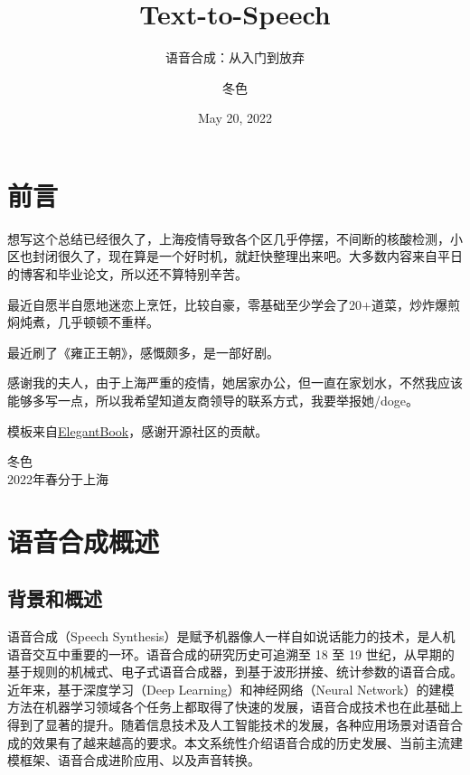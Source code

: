 \documentclass[cn,10pt,math=newtx,citestyle=gb7714-2015,bibstyle=gb7714-2015]{elegantbook}
\title{Text-to-Speech}
\subtitle{语音合成：从入门到放弃}
\author{冬色}
\institute{https://github.com/cnlinxi}
\date{May 20, 2022}
\begin{document}
\maketitle
\frontmatter

\chapter*{前言}


想写这个总结已经很久了，上海疫情导致各个区几乎停摆，不间断的核酸检测，小区也封闭很久了，现在算是一个好时机，就赶快整理出来吧。大多数内容来自平日的博客和毕业论文，所以还不算特别辛苦。

最近自愿半自愿地迷恋上烹饪，比较自豪，零基础至少学会了20+道菜，炒炸爆煎焖炖煮，几乎顿顿不重样。

最近刷了《雍正王朝》，感慨颇多，是一部好剧。

感谢我的夫人，由于上海严重的疫情，她居家办公，但一直在家划水，不然我应该能够多写一点，所以我希望知道友商领导的联系方式，我要举报她/doge。

\vskip 0.5cm

模板来自\href{https://github.com/ElegantLaTeX/ElegantBook}{ElegantBook}，感谢开源社区的贡献。

\vskip 1.5cm

\begin{flushright}
冬色\\
2022年春分于上海
\end{flushright}

\tableofcontents

\mainmatter

\chapter{语音合成概述}

\section{背景和概述}
语音合成（Speech Synthesis）是赋予机器像人一样自如说话能力的技术，是人机语音交互中重要的一环。语音合成的研究历史可追溯至 18 至 19 世纪，从早期的基于规则的机械式、电子式语音合成器，到基于波形拼接、统计参数的语音合成。近年来，基于深度学习（Deep Learning）和神经网络（Neural Network）的建模方法在机器学习领域各个任务上都取得了快速的发展，语音合成技术也在此基础上得到了显著的提升。随着信息技术及人工智能技术的发展，各种应用场景对语音合成的效果有了越来越高的要求。本文系统性介绍语音合成的历史发展、当前主流建模框架、语音合成进阶应用、以及声音转换。
\end{document}
